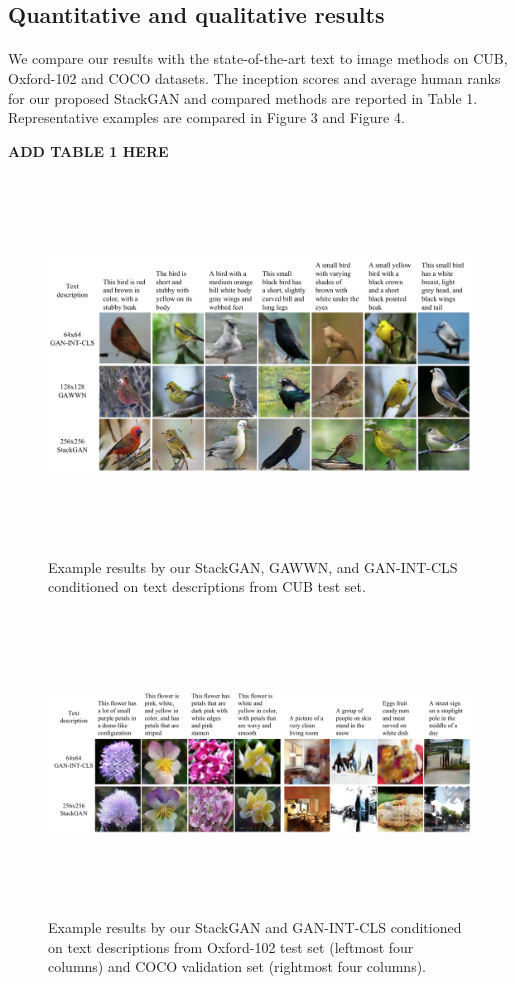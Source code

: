 \documentclass[a4paper,12pt,oneside]{article}
\begin{document}
\subsection{Quantitative and qualitative results}
\paragraph{}
We compare our results with the state-of-the-art text to image methods on CUB, Oxford-102 and COCO datasets. The inception scores and average human ranks for our proposed StackGAN and compared methods are reported in Table 1. Representative examples are compared in Figure 3 and Figure 4. 

\textbf{ADD TABLE 1 HERE}

\begin{figure}[H]
\centering
\includegraphics[height=10cm,width=15cm]{Figure3.png}
\caption{Example results by our StackGAN, GAWWN, and GAN-INT-CLS conditioned on text descriptions from CUB test set.}
\end{figure}

\begin{figure}[H]
\centering
\includegraphics[height=8cm,width=15cm]{Figure4.png}
\caption[Example results by our StackGAN and GAN-INT-CLS conditioned on text descriptions from Oxford-102 test set and COCO validation set]{Example results by our StackGAN and GAN-INT-CLS conditioned on text descriptions from Oxford-102 test set (leftmost
four columns) and COCO validation set (rightmost four columns).}
\end{figure}
\end{document}
